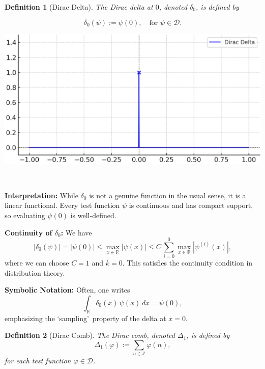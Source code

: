 \documentclass[11pt,openany]{book}
\newtheorem{definition}{Definition}[section]
\begin{document}
\begin{definition}[Dirac Delta] \noindent \medskip
The \emph{Dirac delta} at $0$, denoted $\delta_0$, is defined by \\
\begin{minipage}[htp]{0.45\textwidth}\Large
    \[
\delta_0(\psi) := \psi(0), \quad \text{for } \psi \in \mathcal{D}.
\]
\normalsize
\end{minipage}
\hfill
\begin{minipage}[htp]{0.55\textwidth}
    \begin{center}
        \includegraphics[width=1.1\textwidth]{images/dirac_delta.png}
    \end{center}
\end{minipage}\\

\end{definition}

\noindent
\textbf{Interpretation:} While $\delta_0$ is not a genuine function in the usual sense, it is a linear functional. Every test function $\psi$ is continuous and has compact support, so evaluating $\psi(0)$ is well-defined.

\medskip
\noindent
\textbf{Continuity of $\delta_0$:} We have
\[
|\delta_0(\psi)| = |\psi(0)| \leq \max_{x \in \mathbb{R}}|\psi(x)| \leq C\, \sum_{i=0}^0 \max_{x \in \mathbb{R}}|\psi^{(i)}(x)|,
\]
where we can choose $C = 1$ and $k = 0$. This satisfies the continuity condition in distribution theory.

\medskip
\noindent
\textbf{Symbolic Notation:} Often, one writes
\[
\int_{\mathbb{R}} \delta_0(x)\,\psi(x)\,dx = \psi(0),
\]
emphasizing the \textquoteleft sampling\textquoteright\ property of the delta at $x=0$.

\begin{definition}[Dirac Comb]
The \emph{Dirac comb}, denoted $\Delta_1$, is defined by
\[
\Delta_{1}(\varphi) := \sum_{n \in \mathbb{Z}} \varphi(n),
\]
for each test function $\varphi \in \mathcal{D}$.
\end{definition}
\end{document}
